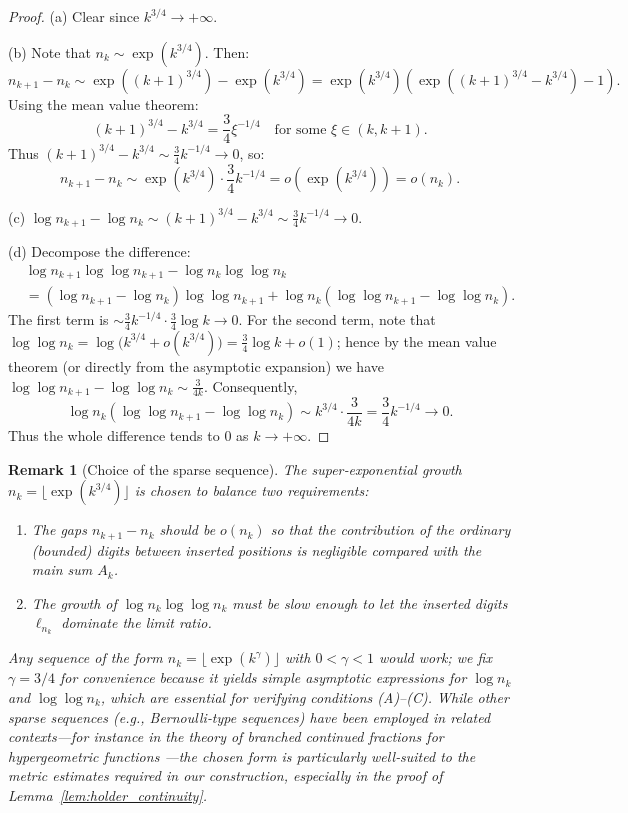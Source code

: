 \documentclass{article}
\newtheorem{remark}[theorem]{Remark}
\numberwithin{equation}{section}
\begin{document}
\begin{proof}
(a) Clear since $k^{3/4} \to +\infty$.

\noindent (b) Note that $n_k \sim \exp(k^{3/4})$. Then:
\[
n_{k+1} - n_k \sim \exp((k+1)^{3/4}) - \exp(k^{3/4}) = \exp(k^{3/4})\left(\exp((k+1)^{3/4} - k^{3/4}) - 1\right).
\]
Using the mean value theorem:
\[
(k+1)^{3/4} - k^{3/4} = \frac{3}{4}\xi^{-1/4} \quad \text{for some } \xi \in (k, k+1).
\]
Thus $(k+1)^{3/4} - k^{3/4} \sim \frac{3}{4}k^{-1/4} \to 0$, so:
\[
n_{k+1} - n_k \sim \exp(k^{3/4}) \cdot \frac{3}{4}k^{-1/4} = o(\exp(k^{3/4})) = o(n_k).
\]

\noindent (c) $\log n_{k+1} - \log n_k \sim (k+1)^{3/4} - k^{3/4} \sim \frac{3}{4}k^{-1/4} \to 0$.

\noindent (d) Decompose the difference:
\begin{align*}
&\log n_{k+1} \log \log n_{k+1} - \log n_k \log \log n_k \\
&= (\log n_{k+1} - \log n_k) \log \log n_{k+1} + \log n_k (\log \log n_{k+1} - \log \log n_k).
\end{align*}
The first term is $\sim \frac{3}{4}k^{-1/4} \cdot \frac{3}{4}\log k \to 0$. 
{For the second term, note that $\log \log n_k = \log\bigl(k^{3/4}+o(k^{3/4})\bigr) = \frac{3}{4}\log k + o(1)$; hence by the mean value theorem (or directly from the asymptotic expansion) we have $\log \log n_{k+1} - \log \log n_k \sim \frac{3}{4k}$. Consequently,
\[
\log n_k (\log \log n_{k+1} - \log \log n_k) \sim k^{3/4} \cdot \frac{3}{4k} = \frac{3}{4}k^{-1/4} \to 0.
\]
Thus the whole difference tends to $0$ as $k\to+\infty$.}
\end{proof}

{\begin{remark}[Choice of the sparse sequence]\label{rem:sparse-sequence}
The super‑exponential growth \(n_k = \lfloor \exp(k^{3/4}) \rfloor\) is chosen to balance two requirements:
\begin{enumerate}
    \item[(i)] The gaps \(n_{k+1}-n_k\) should be \(o(n_k)\) so that the contribution of the ordinary (bounded) digits between inserted positions is negligible compared with the main sum \(A_k\).
    \item[(ii)] The growth of \(\log n_k \log\log n_k\) must be slow enough to let the inserted digits \(\ell_{n_k}\) dominate the limit ratio.
\end{enumerate}
Any sequence of the form \(n_k = \lfloor \exp(k^{\gamma}) \rfloor\) with \(0<\gamma<1\) would work; we fix \(\gamma=3/4\) for convenience because it yields simple asymptotic expressions for \(\log n_k\) and \(\log\log n_k\), which are essential for verifying conditions (A)--(C).  
While other sparse sequences (e.g., Bernoulli‑type sequences) have been employed in related contexts—for instance in the theory of branched continued fractions for hypergeometric functions \cite{DDH}—the chosen form is particularly well‑suited to the metric estimates required in our construction, especially in the proof of Lemma~\ref{lem:holder_continuity}.
\end{remark}}
\end{document}
